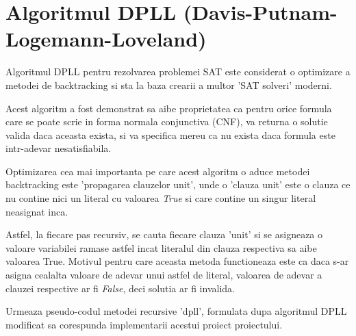 

\chapter{Algoritmul DPLL (Davis-Putnam-Logemann-Loveland)}

Algoritmul DPLL pentru rezolvarea problemei SAT este considerat o optimizare a metodei de backtracking si sta la baza crearii a multor 'SAT solveri' moderni.

Acest algoritm a fost demonstrat sa aibe proprietatea ca pentru orice formula care se poate scrie in forma normala conjunctiva (CNF), va returna o solutie valida daca aceasta exista, si va specifica mereu ca nu exista daca formula este intr-adevar nesatisfiabila.

Optimizarea cea mai importanta pe care acest algoritm o aduce metodei \linebreak backtracking este 'propagarea clauzelor unit', unde o 'clauza unit' este o clauza ce nu contine nici un literal cu valoarea \textit{True} si care contine un singur literal neasignat inca. 

Astfel, la fiecare pas recursiv, se cauta fiecare clauza 'unit' si se asigneaza o \linebreak valoare variabilei ramase astfel incat literalul din clauza respectiva sa aibe valoarea True. Motivul pentru care aceasta metoda functioneaza este ca daca s-ar asigna \linebreak cealalta valoare de adevar unui astfel de literal, valoarea de adevar a clauzei respective ar fi \textit{False}, deci solutia ar fi invalida.

Urmeaza pseudo-codul metodei recursive 'dpll', formulata dupa algoritmul DPLL modificat sa corespunda implementarii acestui proiect proiectului.


